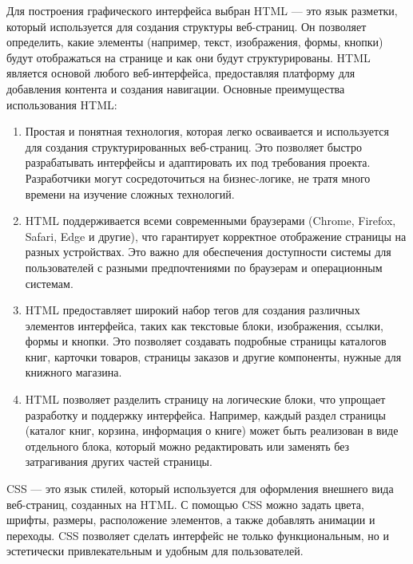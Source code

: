 Для построения графического интерфейса выбран HTML — это язык разметки, который используется для создания структуры веб-страниц. Он позволяет определить, какие элементы (например, текст, изображения, формы, кнопки) будут отображаться на странице и как они будут структурированы. HTML является основой любого веб-интерфейса, предоставляя платформу для добавления контента и создания навигации.
Основные преимущества использования HTML:
\begin{enumerate}
	\item Простая и понятная технология, которая легко осваивается и используется для создания структурированных веб-страниц. Это позволяет быстро разрабатывать интерфейсы и адаптировать их под требования проекта. Разработчики могут сосредоточиться на бизнес-логике, не тратя много времени на изучение сложных технологий.
	\item HTML поддерживается всеми современными браузерами (Chrome, Firefox, Safari, Edge и другие), что гарантирует корректное отображение страницы на разных устройствах. Это важно для обеспечения доступности системы для пользователей с разными предпочтениями по браузерам и операционным системам.
	\item HTML предоставляет широкий набор тегов для создания различных элементов интерфейса, таких как текстовые блоки, изображения, ссылки, формы и кнопки. Это позволяет создавать подробные страницы каталогов книг, карточки товаров, страницы заказов и другие компоненты, нужные для книжного магазина.
	\item HTML позволяет разделить страницу на логические блоки, что упрощает разработку и поддержку интерфейса. Например, каждый раздел страницы (каталог книг, корзина, информация о книге) может быть реализован в виде отдельного блока, который можно редактировать или заменять без затрагивания других частей страницы.
\end{enumerate}
CSS — это язык стилей, который используется для оформления внешнего вида веб-страниц, созданных на HTML. С помощью CSS можно задать цвета, шрифты, размеры, расположение элементов, а также добавлять анимации и переходы. CSS позволяет сделать интерфейс не только функциональным, но и эстетически привлекательным и удобным для пользователей.
